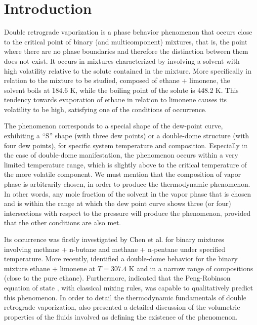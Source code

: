 \documentclass[journal=iecred,manuscript=article]{achemso}
\theoremstyle{definition}
\theoremstyle{remark}
\begin{document}
\section{Introduction}

Double retrograde vaporization is a phase behavior phenomenon that occurs close to the critical point of binary (and multicomponent) mixtures, that is, the point where there are no phase boundaries and therefore the distinction between them does not exist. It occurs in mixtures characterized by involving a solvent with high volatility relative to the solute contained in the mixture. More specifically in relation to the mixture to be studied, composed of ethane + limonene, the solvent boils at 184.6 K, while the boiling point of the solute is 448.2 K. This tendency towards evaporation of ethane in relation to limonene causes its volatility to be high, satisfying one of the conditions of occurrence.

The phenomenon corresponds to a special shape of the dew-point curve, exhibiting a \enquote{S} shape (with three dew points) or a double-dome structure (with four dew points), for specific system temperature and composition. Especially in the case of double-dome manifestation, the phenomenon occurs within a very limited temperature range, which is slightly above to the critical temperature of the more volatile component. We must mention that the composition of vapor phase is arbitrarily chosen, in order to produce the thermodynamic phenomenon. In other words, any mole fraction of the solvent in the vapor phase that is chosen and is within the range at which the dew point curve shows three (or four) intersections with respect to the pressure will produce the phenomenon, provided that the other conditions are also met.

Its occurrence was firstly investigated by Chen et al. for binary mixtures involving methane + n-butane \cite{chen_1} and methane + n-pentane \cite{chen_2} under specified temperature. More recently, \citet{raeissi_1} identified a double-dome behavior for the binary mixture ethane + limonene at $T = 307.4$ K and in a narrow range of compositions (close to the pure ethane). Furthermore, \citet{raeissi_2} indicated that the Peng-Robinson equation of state \citep{peng_robinson}, with classical mixing rules, was capable to qualitatively predict this phenomenon. In order to detail the thermodynamic fundamentals of double retrograde vaporization, \citet{raeissi2004thermodynamic} also presented a detailed discussion of the volumetric properties of the fluids involved as defining the existence of the phenomenon.
\end{document}
